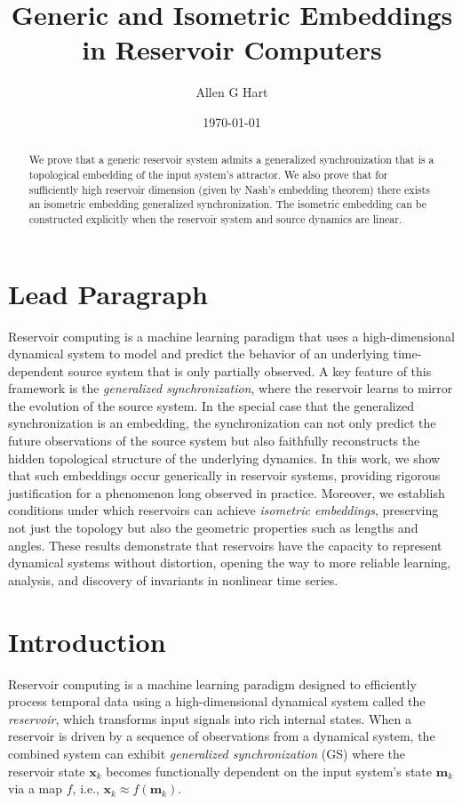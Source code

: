\documentclass{article}
\title{Generic and Isometric Embeddings in Reservoir Computers}
\author{Allen G Hart}
\affil{University of Warwick, Coventry, CV4 7AL, UK}
\date{\today}
\theoremstyle{definition}
\theoremstyle{definition}
\numberwithin{theorem}{section}
\begin{document}
\maketitle

\begin{abstract}
    We prove that a generic reservoir system admits a generalized synchronization that is a topological embedding of the input system's attractor. We also prove that for sufficiently high reservoir dimension (given by Nash's embedding theorem) there exists an isometric embedding generalized synchronization. The isometric embedding can be constructed explicitly when the reservoir system and source dynamics are linear. 
\end{abstract}

\section*{Lead Paragraph}

Reservoir computing is a machine learning paradigm that uses a high-dimensional dynamical system to model and predict the behavior of an underlying time-dependent source system that is only partially observed. A key feature of this framework is the \emph{generalized synchronization}, where the reservoir learns to mirror the evolution of the source system. In the special case that the generalized synchronization is an embedding, the synchronization can not only predict the future observations of the source system but also faithfully reconstructs the hidden topological structure of the underlying dynamics. In this work, we show that such embeddings occur generically in reservoir systems, providing rigorous justification for a phenomenon long observed in practice. Moreover, we establish conditions under which reservoirs can achieve \emph{isometric embeddings}, preserving not just the topology but also the geometric properties such as lengths and angles. These results demonstrate that reservoirs have the capacity to represent dynamical systems without distortion, opening the way to more reliable learning, analysis, and discovery of invariants in nonlinear time series.

\section{Introduction}

Reservoir computing is a machine learning paradigm designed to efficiently process temporal data using a high-dimensional dynamical system called the \emph{reservoir}, which transforms input signals into rich internal states. When a reservoir is driven by a sequence of observations from a dynamical system, the combined system can exhibit \emph{generalized synchronization} (GS) \cite{Hart2021, Hart2020, HartThesis2022, Hart2024, Grigoryeva2021, Grigoryeva2023, HaraKokubu2022, Hu2022, Kobayashi2021, Lu2017, Lu2018, Lymburn2019Reservoir, Nazerian2023, Wu2024, Verzelli2020, Chen2022, Ohkubo2024, Parlitz2024, Platt2021, Platt2022, Ruffini2018} where the reservoir state $\mathbf{x}_k$ becomes functionally dependent on the input system’s state $\mathbf{m}_k$ via a map $f$, i.e., $\mathbf{x}_k \approx f(\mathbf{m}_k)$.
\end{document}
